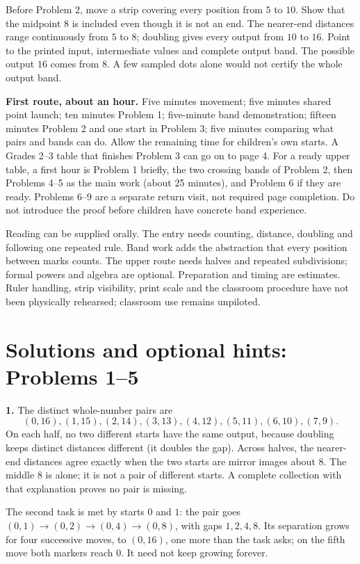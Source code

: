 \documentclass[11pt,letterpaper]{article}
\begin{document}
Before Problem 2, move a strip covering every position from $5$ to $10$. Show that the midpoint $8$ is included even though it is not an end. The nearer-end distances range continuously from $5$ to $8$; doubling gives every output from $10$ to $16$. Point to the printed input, intermediate values and complete output band. The possible output $16$ comes from $8$. A few sampled dots alone would not certify the whole output band.

\textbf{First route, about an hour.} Five minutes movement; five minutes shared point launch; ten minutes Problem 1; five-minute band demonstration; fifteen minutes Problem 2 and one start in Problem 3; five minutes comparing what pairs and bands can do. Allow the remaining time for children's own starts. A Grades 2--3 table that finishes Problem 3 can go on to page 4. For a ready upper table, a first hour is Problem 1 briefly, the two crossing bands of Problem 2, then Problems 4--5 as the main work (about 25 minutes), and Problem 6 if they are ready. Problems 6--9 are a separate return visit, not required page completion. Do not introduce the proof before children have concrete band experience.

Reading can be supplied orally. The entry needs counting, distance, doubling and following one repeated rule. Band work adds the abstraction that every position between marks counts. The upper route needs halves and repeated subdivisions; formal powers and algebra are optional. Preparation and timing are estimates. Ruler handling, strip visibility, print scale and the classroom procedure have not been physically rehearsed; classroom use remains unpiloted.
\newpage
\section*{Solutions and optional hints: Problems 1--5}
\textbf{1.} The distinct whole-number pairs are
\[(0,16),(1,15),(2,14),(3,13),(4,12),(5,11),(6,10),(7,9).\]
On each half, no two different starts have the same output, because doubling keeps distinct distances different (it doubles the gap). Across halves, the nearer-end distances agree exactly when the two starts are mirror images about $8$. The middle $8$ is alone; it is not a pair of different starts. A complete collection with that explanation proves no pair is missing.

The second task is met by starts $0$ and $1$: the pair goes $(0,1)\to(0,2)\to(0,4)\to(0,8)$, with gaps $1,2,4,8$. Its separation grows for four successive moves, to $(0,16)$, one more than the task asks; on the fifth move both markers reach $0$. It need not keep growing forever.
\end{document}
